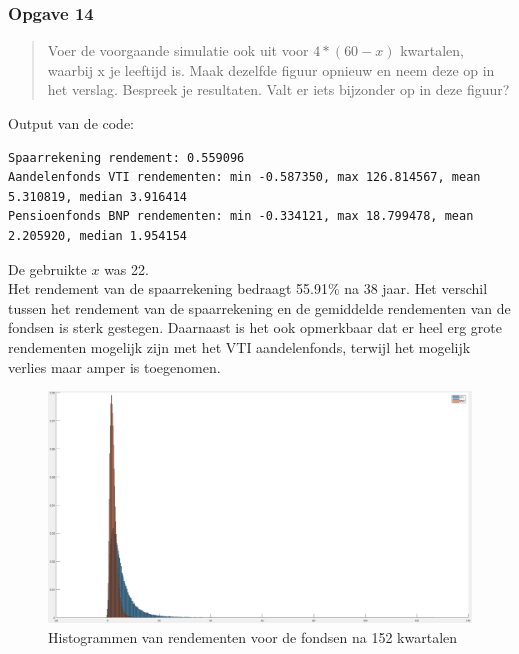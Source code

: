 \documentclass[11pt, a4paper, titlepage, openright]{article}
\begin{document}
	\newpage
	\subsubsection{Opgave 14}
		\begin{quote}
			Voer de voorgaande simulatie ook uit voor \( 4 * (60 - x) \) kwartalen, waarbij x je leeftijd is.
			Maak dezelfde figuur opnieuw en neem deze op in het verslag. Bespreek je resultaten. Valt er iets bijzonder op in deze figuur?
		\end{quote}

		\noindent Output van de code:
\begin{lstlisting}
Spaarrekening rendement: 0.559096
Aandelenfonds VTI rendementen: min -0.587350, max 126.814567, mean 5.310819, median 3.916414
Pensioenfonds BNP rendementen: min -0.334121, max 18.799478, mean 2.205920, median 1.954154\end{lstlisting}
		De gebruikte \( x \) was 22. \\
		Het rendement van de spaarrekening bedraagt 55.91\% na 38 jaar. Het verschil tussen het rendement van de spaarrekening en de
		gemiddelde rendementen van de fondsen is sterk gestegen. Daarnaast is het ook opmerkbaar dat er heel erg grote rendementen mogelijk
		zijn met het VTI aandelenfonds, terwijl het mogelijk verlies maar amper is toegenomen.


		\begin{figure}[H]
			\centering
			\includegraphics[width=1\linewidth]{../ex14-backup}
			\caption{Histogrammen van rendementen voor de fondsen na 152 kwartalen}
			\label{fig:ex14}
		\end{figure}

\end{document}
